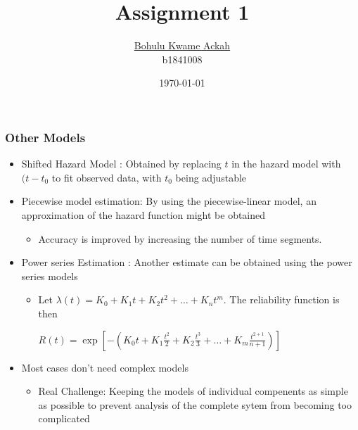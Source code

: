 \documentclass{beamer}  %
\title[Assignment 1]{Assignment 1}
\author[Bohulu]{ \underline{Bohulu Kwame Ackah} \\ b1841008}
\institute[UEC]{Graduate School of Informatics and Engineering\\ The University of Electro-Communications}
\date[Week 3]{\today}
\begin{document}
\frame{\titlepage}






\begin{frame}
\frametitle{Other Models}
\begin{itemize}
\item Shifted Hazard Model : Obtained by replacing $t$ in the hazard model with $(t-t_0$ to fit observed data, with $t_0$ being adjustable

\item Piecewise model estimation: By using the piecewise-linear model, an approximation  of the hazard function might be obtained

\begin{itemize}
\item Accuracy is improved by increasing the number of time segments.
\end{itemize}

\item Power series Estimation : Another estimate can be obtained using the power series models
\begin{itemize}
\item Let $\lambda(t)=K_{0}+K_{1} t+K_{2} t^{2}+\ldots+K_{n} t^{m}$. The reliability function is then

$R(t)=\exp \left[-\left(K_{0} t+K_{1} \frac{t^{2}}{2}+K_{2} \frac{t^{3}}{3}+\ldots+K_{m} \frac{t^{2+1}}{n+1}\right)\right]$
\end{itemize}
\item Most cases don't need complex models
\begin{itemize}
\item Real Challenge: Keeping the models of individual compenents as simple as possible to prevent analysis of the complete sytem from becoming too complicated\end{itemize}

\end{itemize}
\end{frame}
\end{document}
